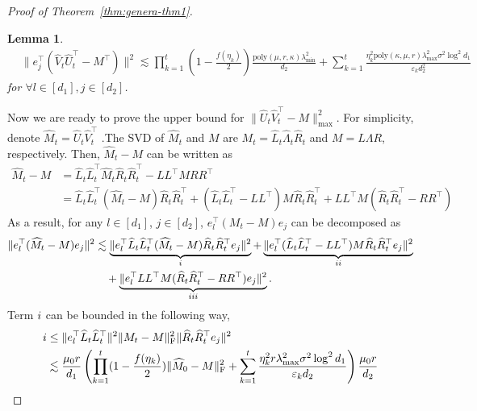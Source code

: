 \documentclass[12pt]{article}
\newcommand\fro[1]{\| #1 \|_{\rm{F}}}
\newtheorem{Lemma}{Lemma}
\theoremstyle{plain}
\begin{document}
\begin{proof}[Proof of Theorem~\ref{thm:genera-thm1}]
\begin{Lemma}
\begin{align*}
            &\|e_j^{\top}(\widehat{V}_t\widehat{U}_t^{\top}-M^{\top})\|^2\lesssim \prod_{k=1}^{t}(1-\frac{f(\eta_k)}{2}) \frac{\text{poly}(\mu,r,\kappa)\lambda_{\min}^2}{d_2} +  \sum_{k=1}^{t} \frac{\eta_k^2\text{poly}(\kappa,\mu,r)\lambda_{\max}^2\sigma^2\log^2d_1}{\varepsilon_k d_2^2}
        \end{align*}
        for $\forall l \in [d_1], j\in [d_2]$.
    \end{Lemma}
    \noindent Now we are ready to prove the upper bound for $\|\widehat{U}_t\widehat{V}_t^{\top}-M\|_{\max}^2$. For simplicity, denote $\widehat{M}_t=\widehat{U}_t\widehat{V}_t^{\top}$ .The SVD of $\widehat{M}_t$ and $M$ are $M_t=\widehat{L}_t\widehat{\Lambda}_t\widehat{R}_t$ and $M=L\Lambda R$, respectively. Then, $\widehat{M}_t - M$ can be written as
    \begin{align*}
        \widehat{M}_t - M&= \widehat{L}_t\widehat{L}_t^{\top}\widehat{M}_t\widehat{R}_t\widehat{R}_t^{\top} - LL^{\top}MRR^{\top} \\
        &= \widehat{L}_t\widehat{L}_t^{\top}(\widehat{M}_t-M)\widehat{R}_t\widehat{R}_t^{\top} + (\widehat{L}_t\widehat{L}_t^{\top}-LL^{\top})M\widehat{R}_t\widehat{R}_t^{\top} + LL^{\top}M(\widehat{R}_t\widehat{R}_t^{\top}-RR^{\top})
    \end{align*}
    As a result, for any $l\in [d_1]$, $j\in [d_2]$, $e_l^{\top}(M_t - M)e_j$ can be decomposed as
    \begin{align*}
        \|e_l^{\top}(\widehat{M}_t - M)e_j\|^2&\lesssim \underbrace{\|e_l^{\top}\widehat{L}_t\widehat{L}_t^{\top}(\widehat{M}_t-M)\widehat{R}_t\widehat{R}_t^{\top}e_j\|^2}_{\uppercase\expandafter{\romannumeral1}}  + \underbrace{\|e_l^{\top}(\widehat{L}_t\widehat{L}_t^{\top}-LL^{\top})M\widehat{R}_t\widehat{R}_t^{\top}e_j\|^2}_{\uppercase\expandafter{\romannumeral2}} \\ &\quad + \underbrace{\|e_l^{\top}LL^{\top}M(\widehat{R}_t\widehat{R}_t^{\top}-RR^{\top})e_j\|^2}_{\uppercase\expandafter{\romannumeral3}}.
    \end{align*}
    Term $\uppercase\expandafter{\romannumeral1}$ can be bounded in the following way,
    \begin{align*}
        \uppercase\expandafter{\romannumeral1}&\leq \|e_l^{\top}\widehat{L}_t\widehat{L}_t^{\top}\|^2\fro{M_t-M}^2\|\widehat{R}_t\widehat{R}_t^{\top}e_j\|^2 \\
        &\lesssim \frac{\mu_0r}{d_1}\left(\prod_{k=1}^{t} (1-\frac{f(\eta_k)}{2})\fro{\widehat{M}_0-M}^2 + \sum_{k=1}^{t}\frac{\eta_k^2r\lambda_{\max}^2\sigma^2\log^2 d_1}{\varepsilon_k d_2}\right)\frac{\mu_0r}{d_2} \\

\end{align*}
\end{proof}
\end{document}
